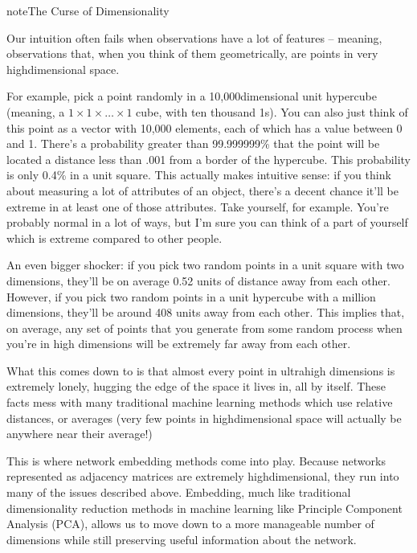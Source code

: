 \documentclass[letterpaper,10pt,english]{jupyterBook}
\begin{document}
\begin{sphinxadmonition}{note}{The Curse of Dimensionality}

\sphinxAtStartPar
Our intuition often fails when observations have a lot of features – meaning, observations that, when you think of them geometrically, are points in very high\sphinxhyphen{}dimensional space.

\sphinxAtStartPar
For example, pick a point randomly in a 10,000\sphinxhyphen{}dimensional unit hypercube (meaning, a \(1 \times 1 \times \dots \times 1\) cube, with ten thousand 1s). You can also just think of this point as a vector with 10,000 elements, each of which has a value between 0 and 1. There’s a probability greater than 99.999999\% that the point will be located a distance less than .001 from a border of the hypercube. This probability is only 0.4\% in a unit square. This actually makes intuitive sense: if you think about measuring a lot of attributes of an object, there’s a decent chance it’ll be extreme in at least one of those attributes. Take yourself, for example. You’re probably normal in a lot of ways, but I’m sure you can think of a part of yourself which is extreme compared to other people.

\sphinxAtStartPar
An even bigger shocker: if you pick two random points in a unit square with two dimensions, they’ll be on average 0.52 units of distance away from each other. However, if you pick two random points in a unit hypercube with a million dimensions, they’ll be around 408 units away from each other. This implies that, on average, any set of points that you generate from some random process when you’re in high dimensions will be extremely far away from each other.

\sphinxAtStartPar
What this comes down to is that almost every point in ultra\sphinxhyphen{}high dimensions is extremely lonely, hugging the edge of the space it lives in, all by itself. These facts mess with many traditional machine learning methods which use relative distances, or averages (very few points in high\sphinxhyphen{}dimensional space will actually be anywhere near their average!) 
\end{sphinxadmonition}

\sphinxAtStartPar
This is where network embedding methods come into play. Because networks represented as adjacency matrices are extremely high\sphinxhyphen{}dimensional, they run into many of the issues described above. Embedding, much like traditional dimensionality reduction methods in machine learning like Principle Component Analysis (PCA), allows us to move down to a more manageable number of dimensions while still preserving useful information about the network.
\end{document}
